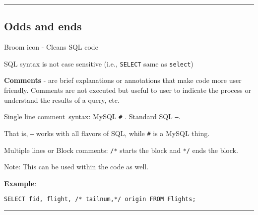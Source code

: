 \documentclass{article}
\begin{document}
\hspace{-0.5cm}\rule[-0.101in]{\textwidth}{0.0025in}
























\subsection*{Odds and ends}

\begin{outline} 
 
  \1 Broom icon - Cleans SQL code


  \1 SQL syntax is not case sensitive (i.e., \texttt{SELECT} same as
\texttt{select})


  \1 \textbf{Comments} - are brief explanations or annotations that
make code more user friendly.  Comments are not executed but useful to user
to indicate the process or understand the results of a query, etc.

      \2 Single line comment\ syntax:  MySQL \texttt{\#} .  Standard
SQL \texttt{--}.

              \3 That is, \texttt{--} works with all flavors of
SQL, while \texttt{\#} is a MySQL thing.  


       \2 Multiple lines or Block comments: \texttt{/*} starts the
block and \texttt{*/} ends the block.  
       
               \3 Note: This can be used within the code as well.
                        
 \1[] \textbf{Example}: 
           
 
 
\begin{lstlisting}[belowskip=-1.5 \baselineskip]  
SELECT fid, flight, /* tailnum,*/ origin FROM Flights;
\end{lstlisting} 

\end{outline} 



\hspace{-0.5cm}\rule[-0.101in]{\textwidth}{0.0025in}
\end{document}
